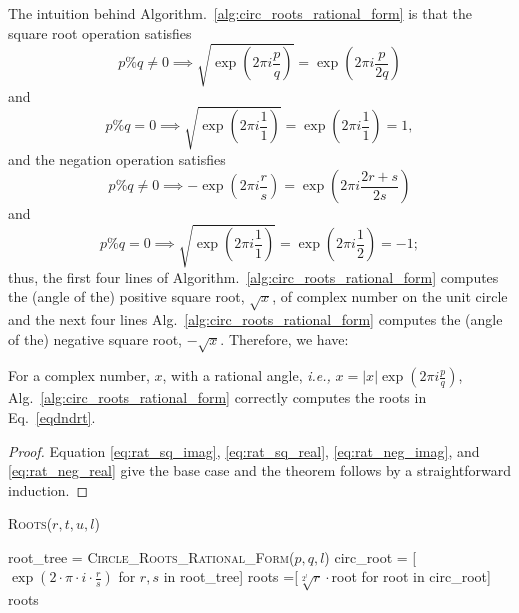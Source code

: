 \documentclass[sigconf]{acmart}
\begin{document}
The intuition behind Algorithm.~\ref{alg:circ_roots_rational_form} is that the square root operation satisfies
\begin{equation}\label{eq:rat_sq_imag}
p \% q \neq  0 \implies   \sqrt{\exp \left(2 \pi i \frac{p}{q}\right)}  = \exp \left(2 \pi i \frac{p}{2q}\right)
\end{equation}
and
\begin{equation}\label{eq:rat_sq_real}
p \% q = 0 \implies   \sqrt{\exp \left(2 \pi i \frac{1}{1}\right)}  = \exp \left(2 \pi i \frac{1}{1}\right) = 1,
\end{equation}
and the negation operation satisfies
\begin{equation}\label{eq:rat_neg_imag}
p \% q \neq  0 \implies   -\exp \left(2 \pi i \frac{r}{s}\right)  = \exp \left(2 \pi i \frac{2r+s} {2s}\right)
\end{equation}
and
\begin{equation}\label{eq:rat_neg_real}
p \% q = 0 \implies   \sqrt{\exp \left(2 \pi i \frac{1}{1}\right)}  = \exp \left(2 \pi i \frac{1}{2}\right) = -1;
\end{equation}
thus, the first four lines of Algorithm.~\ref{alg:circ_roots_rational_form} computes the (angle of the) positive square root, $\sqrt{x}$, of complex number on the unit circle and the next four lines Alg.~\ref{alg:circ_roots_rational_form} computes the (angle of the) negative square root, $-\sqrt{x}$. Therefore, we have:
\begin{theorem}
  For a complex number, $x$, with a rational angle, \emph{i.e.,} $x = |x|\exp \left(2 \pi i \frac{p}{q}\right)$, Alg.~\ref{alg:circ_roots_rational_form} correctly computes the roots in Eq.~\ref{eqdndrt}.
\end{theorem}
\begin{proof}
Equation \ref{eq:rat_sq_imag}, \ref{eq:rat_sq_real}, \ref{eq:rat_neg_imag}, and \ref{eq:rat_neg_real} give the base case and the theorem follows by a straightforward induction.
\end{proof}


\begin{algorithm}
\caption{\textsc{Roots}($r,t,u,l$)}
\label{alg:roots}
\begin{algorithmic}
\STATE root\_tree = \textsc{Circle\_Roots\_Rational\_Form}($p,q,l$)
\STATE circ\_root = [$\exp\left(2\cdot\pi\cdot i \cdot \frac{r}{s}\right)$ for $r,s$ in root\_tree]
\STATE roots =[$\sqrt[2^l]{r}\cdot$root for root in circ\_root]
\RETURN roots
\end{algorithmic}
\end{algorithm}
\end{document}
